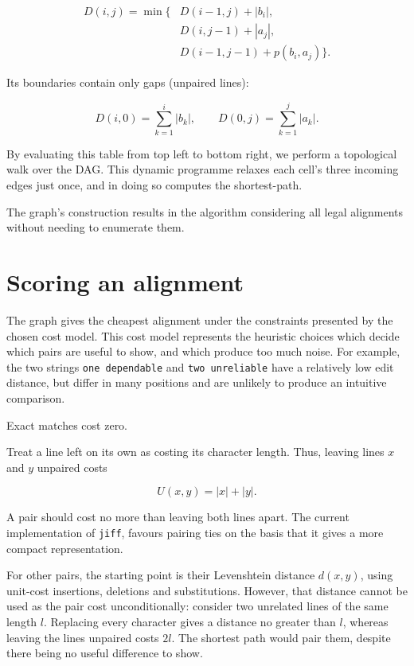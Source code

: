 \documentclass[
]{article}
\begin{document}
\[\begin{aligned}
D(i,j) = \min\{&D(i-1,j) + |b_i|,\\
               &D(i,j-1) + |a_j|,\\
               &D(i-1,j-1) + p(b_i,a_j)\}.
\end{aligned}\]

Its boundaries contain only gaps (unpaired lines):

\[D(i,0)=\sum_{k=1}^{i}|b_k|, \qquad
D(0,j)=\sum_{k=1}^{j}|a_k|.\]

By evaluating this table from top left to bottom right, we perform a
topological walk over the DAG. This dynamic programme relaxes each
cell's three incoming edges just once, and in doing so computes the
shortest-path.

The graph's construction results in the algorithm considering all legal
alignments without needing to enumerate them.

\hypertarget{scoring-an-alignment}{%
\section{Scoring an alignment}\label{scoring-an-alignment}}

The graph gives the cheapest alignment under the constraints presented
by the chosen cost model. This cost model represents the heuristic
choices which decide which pairs are useful to show, and which produce
too much noise. For example, the two strings \texttt{one\ dependable}
and \texttt{two\ unreliable} have a relatively low edit distance, but
differ in many positions and are unlikely to produce an intuitive
comparison.

Exact matches cost zero.

Treat a line left on its own as costing its character length. Thus,
leaving lines \(x\) and \(y\) unpaired costs

\[U(x,y)=|x|+|y|.\]

A pair should cost no more than leaving both lines apart. The current
implementation of \texttt{jiff}, favours pairing ties on the basis that
it gives a more compact representation.

For other pairs, the starting point is their Levenshtein distance
\(d(x,y)\), using unit-cost insertions, deletions and substitutions.
However, that distance cannot be used as the pair cost unconditionally:
consider two unrelated lines of the same length \(l\). Replacing every
character gives a distance no greater than \(l\), whereas leaving the
lines unpaired costs \(2l\). The shortest path would pair them, despite
there being no useful difference to show.
\end{document}
